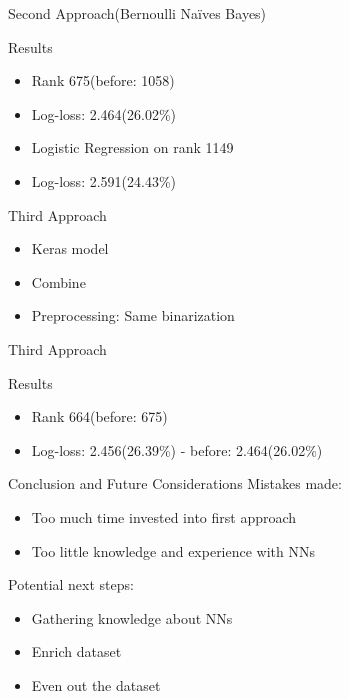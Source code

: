 \documentclass[11pt]{beamer}
\begin{document}
\begin{frame}{Second Approach(Bernoulli Naïves Bayes)}

\end{frame}

\begin{frame}{Results}
\begin{itemize}
\item Rank 675(before: 1058)
\item Log-loss: 2.464(26.02\%)
\item Logistic Regression on rank 1149
\item Log-loss: 2.591(24.43\%)
\end{itemize}
\end{frame}

\begin{frame}{Third Approach}
\begin{itemize}
\item Keras model
\item Combine
\item Preprocessing: Same binarization
\end{itemize}
\end{frame}

\begin{frame}[fragile]{Third Approach}

\end{frame}

\begin{frame}{Results}
\begin{itemize}
\item Rank 664(before: 675)
\item Log-loss: 2.456(26.39\%) - before: 2.464(26.02\%)
\end{itemize}
\end{frame}

\begin{frame}{Conclusion and Future Considerations}
Mistakes made:
\begin{itemize}
\item Too much time invested into first approach
\item Too little knowledge and experience with NNs
\end{itemize}
\vspace{1cm}
Potential next steps:
\begin{itemize}
\item Gathering knowledge about NNs
\item Enrich dataset
\item Even out the dataset
\end{itemize}
\end{frame}
\end{document}
